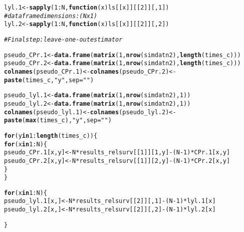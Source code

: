 \documentclass[a4paper,11pt]{article}\usepackage[]{graphicx}\usepackage[]{color}
\makeatletter
\newcommand{\hlnum}[1]{\textcolor[rgb]{0.686,0.059,0.569}{#1}}%
\newcommand{\hlstr}[1]{\textcolor[rgb]{0.192,0.494,0.8}{#1}}%
\newcommand{\hlcom}[1]{\textcolor[rgb]{0.678,0.584,0.686}{\textit{#1}}}%
\newcommand{\hlopt}[1]{\textcolor[rgb]{0,0,0}{#1}}%
\newcommand{\hlstd}[1]{\textcolor[rgb]{0.345,0.345,0.345}{#1}}%
\newcommand{\hlkwa}[1]{\textcolor[rgb]{0.161,0.373,0.58}{\textbf{#1}}}%
\newcommand{\hlkwb}[1]{\textcolor[rgb]{0.69,0.353,0.396}{#1}}%
\newcommand{\hlkwc}[1]{\textcolor[rgb]{0.333,0.667,0.333}{#1}}%
\newcommand{\hlkwd}[1]{\textcolor[rgb]{0.737,0.353,0.396}{\textbf{#1}}}%
\newenvironment{kframe}{%
 \def\at@end@of@kframe{}%
 \ifinner\ifhmode%
  \def\at@end@of@kframe{\end{minipage}}%
  \begin{minipage}{\columnwidth}%
 \fi\fi%
 \def\FrameCommand##1{\hskip\@totalleftmargin \hskip-\fboxsep
 \colorbox{shadecolor}{##1}\hskip-\fboxsep
     \hskip-\linewidth \hskip-\@totalleftmargin \hskip\columnwidth}%
 \MakeFramed {\advance\hsize-\width
   \@totalleftmargin\z@ \linewidth\hsize
   \@setminipage}}%
 {\par\unskip\endMakeFramed%
 \at@end@of@kframe}
\newenvironment{knitrout}{}{} %
\makeatother
\begin{document}
\begin{knitrout}
\begin{kframe}
\begin{alltt}
 \hlstd{lyl.1} \hlkwb{<-} \hlkwd{sapply}\hlstd{(}\hlnum{1}\hlopt{:}\hlstd{N,} \hlkwa{function} \hlstd{(}\hlkwc{x}\hlstd{) ls[[x]][[}\hlnum{2}\hlstd{]][,}\hlnum{1}\hlstd{])}
 \hlcom{#dataframe dimensions: (N x 1)}
 \hlstd{lyl.2} \hlkwb{<-} \hlkwd{sapply}\hlstd{(}\hlnum{1}\hlopt{:}\hlstd{N,} \hlkwa{function} \hlstd{(}\hlkwc{x}\hlstd{) ls[[x]][[}\hlnum{2}\hlstd{]][,}\hlnum{2}\hlstd{])}


 \hlcom{# Final step: leave - one - out estimator}

 \hlstd{pseudo_CPr.1}\hlkwb{<-}\hlkwd{data.frame}\hlstd{(}\hlkwd{matrix}\hlstd{(}\hlnum{1}\hlstd{,}\hlkwd{nrow}\hlstd{(simdatn2),}\hlkwd{length}\hlstd{(times_c)))}
 \hlstd{pseudo_CPr.2}\hlkwb{<-}\hlkwd{data.frame}\hlstd{(}\hlkwd{matrix}\hlstd{(}\hlnum{1}\hlstd{,}\hlkwd{nrow}\hlstd{(simdatn2),}\hlkwd{length}\hlstd{(times_c)))}
  \hlkwd{colnames}\hlstd{(pseudo_CPr.1)}\hlkwb{<-} \hlkwd{colnames}\hlstd{(pseudo_CPr.2)}\hlkwb{<-}
 \hlkwd{paste}\hlstd{(times_c,}\hlstr{"y"}\hlstd{,}\hlkwc{sep}\hlstd{=}\hlstr{""}\hlstd{)}

 \hlstd{pseudo_lyl.1}\hlkwb{<-}\hlkwd{data.frame}\hlstd{(}\hlkwd{matrix}\hlstd{(}\hlnum{1}\hlstd{,}\hlkwd{nrow}\hlstd{(simdatn2),}\hlnum{1}\hlstd{))}
 \hlstd{pseudo_lyl.2}\hlkwb{<-}\hlkwd{data.frame}\hlstd{(}\hlkwd{matrix}\hlstd{(}\hlnum{1}\hlstd{,}\hlkwd{nrow}\hlstd{(simdatn2),}\hlnum{1}\hlstd{))}
  \hlkwd{colnames}\hlstd{(pseudo_lyl.1)}\hlkwb{<-} \hlkwd{colnames}\hlstd{(pseudo_lyl.2)}\hlkwb{<-}
 \hlkwd{paste}\hlstd{(}\hlkwd{max}\hlstd{(times_c),}\hlstr{"y"}\hlstd{,}\hlkwc{sep}\hlstd{=}\hlstr{""}\hlstd{)}

 \hlkwa{for}\hlstd{(y} \hlkwa{in} \hlnum{1}\hlopt{:}\hlkwd{length}\hlstd{(times_c))\{}
  \hlkwa{for} \hlstd{(x} \hlkwa{in} \hlnum{1}\hlopt{:}\hlstd{N)\{}
   \hlstd{pseudo_CPr.1[x,y]}\hlkwb{<-} \hlstd{N}\hlopt{*}\hlstd{results_relsurv[[}\hlnum{1}\hlstd{]][}\hlnum{1}\hlstd{,y]}\hlopt{-}\hlstd{(N}\hlopt{-}\hlnum{1}\hlstd{)}\hlopt{*}\hlstd{CPr.1[x,y]}
   \hlstd{pseudo_CPr.2[x,y]}\hlkwb{<-} \hlstd{N}\hlopt{*}\hlstd{results_relsurv[[}\hlnum{1}\hlstd{]][}\hlnum{2}\hlstd{,y]}\hlopt{-}\hlstd{(N}\hlopt{-}\hlnum{1}\hlstd{)}\hlopt{*}\hlstd{CPr.2[x,y]}
   \hlstd{\}}
 \hlstd{\}}

\hlkwa{for} \hlstd{(x} \hlkwa{in} \hlnum{1}\hlopt{:}\hlstd{N)\{}
   \hlstd{pseudo_lyl.1[x,]}\hlkwb{<-} \hlstd{N}\hlopt{*}\hlstd{results_relsurv[[}\hlnum{2}\hlstd{]][,}\hlnum{1}\hlstd{]}\hlopt{-}\hlstd{(N}\hlopt{-}\hlnum{1}\hlstd{)}\hlopt{*}\hlstd{lyl.1[x]}
   \hlstd{pseudo_lyl.2[x,]}\hlkwb{<-} \hlstd{N}\hlopt{*}\hlstd{results_relsurv[[}\hlnum{2}\hlstd{]][,}\hlnum{2}\hlstd{]}\hlopt{-}\hlstd{(N}\hlopt{-}\hlnum{1}\hlstd{)}\hlopt{*}\hlstd{lyl.2[x]}

\hlstd{\}}
\end{alltt}
\end{kframe}
\end{knitrout}
 
\end{document}

